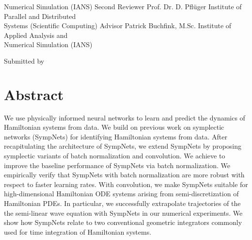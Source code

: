 \documentclass[twoside,a4paper]{article}
\begin{document}
\begin{titlePageST}
\begin{supervisorST}{3}
{Numerical Simulation (IANS)}%
\addSuper%
{Second Reviewer}%
{Prof. Dr. D. Pflüger}%
{Institute of Parallel and Distributed\\[-0.2cm]
Systems (Scientific Computing)}%
\addSuper%
{Advisor}%
{Patrick Buchfink, M.Sc.}%
{Institute of Applied Analysis and\\[-0.2cm]
Numerical Simulation (IANS)}%
\end{supervisorST}%
\vspace{80pt}%
\begin{authorST}{Submitted by}%
\end{authorST}%
\end{titlePageST}
\clearpage
\newpage\thispagestyle{plain}\null
\newpage\thispagestyle{plain}

%
%
\section*{Abstract}
We use physically informed neural networks to learn and predict the dynamics 
of Hamiltonian systems from data.
We build on previous work on symplectic networks (SympNets) for
identifying Hamiltonian systems from data. After recapitulating the 
architecture of SympNets, we extend SympNets by 
proposing symplectic variants of batch normalization and convolution. We achieve 
to improve the baseline performance of SympNets via batch normalization. 
We empirically verify that SympNets with batch normalization are more robust
with respect to faster learning rates.
With convolution,
we make SympNets suitable for high-dimensional Hamiltonian ODE systems arising from
semi-discretization of Hamiltonian PDEs. In particular, we successfully 
extrapolate trajectories of the the semi-linear wave equation with SympNets in our 
numerical experiments. We show how SympNets relate to two conventional geometric 
integrators commonly used for time integration of Hamiltonian systems.
\clearpage
\newpage\thispagestyle{plain}\null
\newpage\thispagestyle{plain}

%
%
\end{document}
